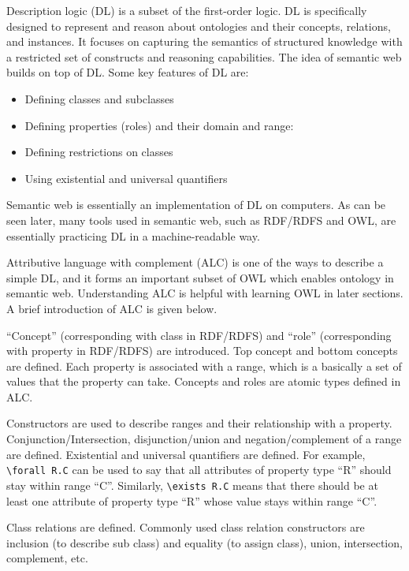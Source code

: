 Description logic (DL) is a subset of the first-order logic. DL is specifically designed to represent and reason about ontologies and their concepts, relations, and instances. It focuses on capturing the semantics of structured knowledge with a restricted set of constructs and reasoning capabilities. The idea of semantic web builds on top of DL.  Some key features of DL are:
\begin{itemize}
  \item Defining classes and subclasses
  \item Defining properties (roles) and their domain and range:
  \item Defining restrictions on classes
  \item Using existential and universal quantifiers
\end{itemize}
Semantic web is essentially an implementation of DL on computers. As can be seen later, many tools used in semantic web, such as RDF/RDFS and OWL, are essentially practicing DL in a machine-readable way.

Attributive language with complement (ALC) is one of the ways to describe a simple DL, and it forms an important subset of OWL which enables ontology in semantic web. Understanding ALC is helpful with learning OWL in later sections. A brief introduction of ALC is given below.

``Concept'' (corresponding with class in RDF/RDFS) and ``role'' (corresponding with property in RDF/RDFS) are introduced. Top concept and bottom concepts are defined. Each property is associated with a range, which is a basically a set of values that the property can take. Concepts and roles are atomic types defined in ALC.

Constructors are used to describe ranges and their relationship with a property. Conjunction/Intersection, disjunction/union and negation/complement of a range are defined. Existential and universal quantifiers are defined. For example, \verb|\forall R.C| can be used to say that all attributes of property type ``R'' should stay within range ``C''. Similarly, \verb|\exists R.C| means that there should be at least one attribute of property type ``R'' whose value stays within range ``C''.

Class relations are defined. Commonly used class relation constructors are inclusion (to describe sub class) and equality (to assign class), union, intersection, complement, etc.

